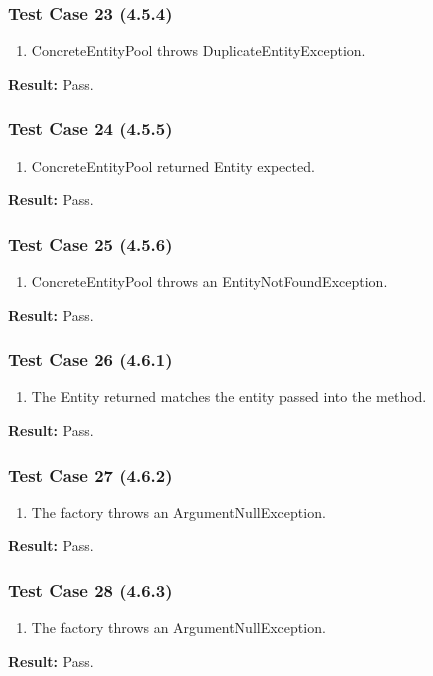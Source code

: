 \documentclass[a4paper,12pt]{article}
\begin{document}
		\subsubsection{Test Case 23 (4.5.4)}
				\begin{enumerate}
					\item ConcreteEntityPool throws DuplicateEntityException.
				\end{enumerate}
			\textbf{Result: }Pass.
		\subsubsection{Test Case 24 (4.5.5)}
				\begin{enumerate}
					\item ConcreteEntityPool returned Entity expected.
				\end{enumerate}
			\textbf{Result: }Pass.
		\subsubsection{Test Case 25 (4.5.6)}
				\begin{enumerate}
					\item ConcreteEntityPool throws an EntityNotFoundException.
				\end{enumerate}
			\textbf{Result: }Pass.
		\subsubsection{Test Case 26 (4.6.1)}
				\begin{enumerate}
					\item The Entity returned matches the entity passed into the method.
				\end{enumerate}
			\textbf{Result: }Pass.
		\subsubsection{Test Case 27 (4.6.2)}
				\begin{enumerate}
					\item The factory throws an ArgumentNullException.
				\end{enumerate}
			\textbf{Result: }Pass.
		\subsubsection{Test Case 28 (4.6.3)}
				\begin{enumerate}
					\item The factory throws an ArgumentNullException.
				\end{enumerate}
			\textbf{Result: }Pass.
\end{document}
